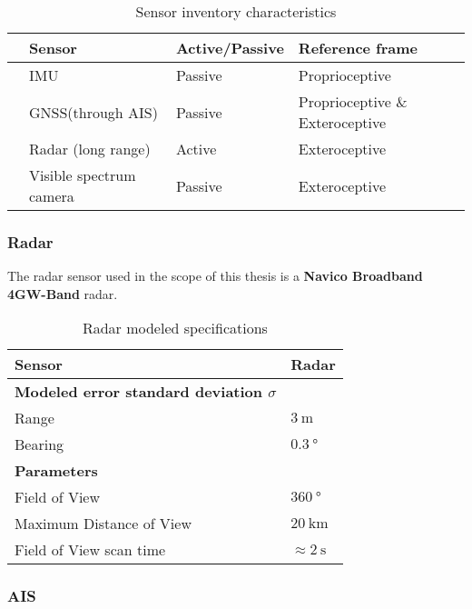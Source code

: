 \begin{table}[H]
		\centering
	\caption{Sensor inventory characteristics}
	\label{tab:sensor_active}
	\begin{tabular}{llll}
		\hline
		& \textbf{Sensor}         & \textbf{Active/Passive} & \textbf{Reference frame} \\ \hline
		& IMU                     & Passive                 & Proprioceptive                        \\ 
		& GNSS(through AIS)       & Passive                 & Proprioceptive \& Exteroceptive \\
		& Radar (long range)      & Active                  & Exteroceptive                         \\ 
		& Visible spectrum camera & Passive                 & Exteroceptive                         \\ \hline
	\end{tabular}
\end{table}

\subsubsection{Radar}
The radar sensor used in the scope of this thesis is a \textbf{Navico Broadband}  \textbf{4G\tm W-Band} radar.


\begin{table}[]
	\centering
	\caption{Radar modeled specifications}
	\label{tab:radar_specs}
	\begin{tabular}{ll}
		\hline
		\textbf{Sensor} & Radar \\ \hline
		\textbf{Modeled error standard deviation $\sigma$} &  \\
		Range & $\SI{3}{\m}$ \\
		Bearing & $\SI{0.3}{\degree}$ \\ \hline
		\textbf{Parameters} &  \\
		Field of View & $\SI{360}{\degree}$ \\
		Maximum Distance of View & $\SI{20}{\km}$ \\
		Field of View scan time & $\approx \SI{2}{\second}$ \\ \hline
	\end{tabular}
\end{table}
\subsubsection{AIS}

